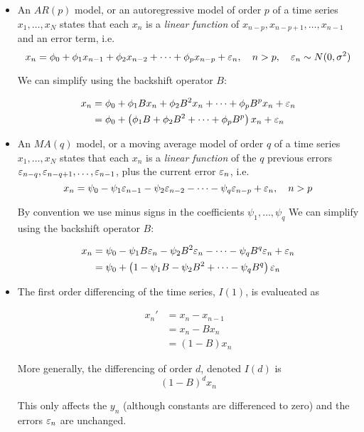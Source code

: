 \begin{itemize}
\item An $AR(p)$ model, or an autoregressive model of order $p$ of a time series $x_1,\dots,x_N$ states that each $x_n$ is a \textit{linear function} of $x_{n-p},x_{n-p+1},\dots,x_{n-1}$ and an error term, i.e. 
$$x_n= \phi_0+\phi_1 x_{n-1}+\phi_2 x_{n-2} +\dots + \phi_p x_{n-p}+\varepsilon_n,\quad n>p,\quad \varepsilon_n\sim N(0,\sigma^2)$$

We can simplify using the backshift operator $B$:

\begin{align}
x_n
&= \phi_0+\phi_1 Bx_n+\phi_2 B^2x_n +\dots + \phi_p B^px_n +\varepsilon_n\nonumber \\
&= \phi_0+\left(\phi_1 B+\phi_2 B^2 +\dots + \phi_p B^p\right)x_n +\varepsilon_n
\end{align}

\item An $MA(q)$ model, or a moving average model of order $q$ of a time series $x_1,\dots,x_N$ states that each $x_n$ is a \textit{linear function} of the $q$ previous errors $\varepsilon_{n-q},\varepsilon_{n-q+1},\dots,\varepsilon_{n-1}$, plus the current error $\varepsilon_n$, i.e. 
$$x_n= \psi_0-\psi_1 \varepsilon_{n-1}-\psi_2 \varepsilon_{n-2} -\dots - \psi_q \varepsilon_{n-p}+\varepsilon_n,\quad n>p$$

By convention we use minus signs in the coefficients $\psi_1,\dots,\psi_q$
We can simplify using the backshift operator $B$:

\begin{align}
x_n
&= \psi_0-\psi_1 B\varepsilon_n-\psi_2 B^2\varepsilon_n -\dots - \psi_q B^q\varepsilon_n + \varepsilon_n \nonumber \\
&= \psi_0+\left(1-\psi_1 B-\psi_2 B^2 +\dots - \psi_q B^q\right)\varepsilon_n 
\end{align}

\item The first order differencing of the time series, $I(1)$, is evalueated as 

\begin{align}
x_n'
&=x_n-x_{n-1}\nonumber \\
&=x_n-Bx_n \nonumber \\
&=\left(1-B\right)x_n
\end{align}

More generally, the differencing of order $d$, denoted $I(d)$ is 
$$(1-B)^d x_n$$

This only affects the $y_n$ (although constants are differenced to zero) and the errors $\varepsilon_n$ are unchanged.
\end{itemize}

